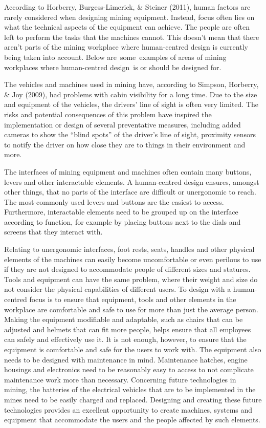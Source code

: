 \documentclass[
  12pt,
]{scrbook}
\begin{document}
According to Horberry, Burgess-Limerick, \& Steiner (2011), human factors are rarely considered when designing mining equipment. Instead, focus often lies on what the technical aspects of the equipment can achieve. The people are often left to perform the tasks that the machines cannot. This doesn't mean that there aren't parts of the mining workplace where human-centred design is currently being taken into account. Below are~some~examples of areas of mining workplaces where human-centred design~is or should be designed for.

The vehicles and machines used in mining have, according to Simpson, Horberry, \& Joy (2009), had problems with cabin visibility for a long time. Due to the size and equipment of the vehicles, the drivers' line of sight is often very limited. The risks and potential consequences of this problem have inspired the implementation or design of several preventative measures, including added cameras to show the ``blind spots'' of the driver's line of sight, proximity sensors to notify the driver on how close they are to things in their environment and more.

The interfaces of mining equipment and machines often contain many buttons, levers and other interactable elements. A human-centred design ensures, amongst other things, that no parts of the interface are difficult or unergonomic to reach. The most-commonly used levers and buttons are the easiest to access. Furthermore, interactable elements need to be grouped up on the interface according to function, for example by placing buttons next to the dials and screens that they interact with.

Relating to unergonomic interfaces, foot rests, seats, handles and other physical elements of the machines can easily become uncomfortable or even perilous to use if they are not designed to accommodate people of different sizes and statures. Tools and equipment can have the same problem, where their weight and size do not consider the physical capabilities of different users. To design with a human-centred focus is to ensure that equipment, tools and other elements in the workplace are comfortable and safe to use for more than just the average person. Making the equipment modifiable and adaptable, such as chairs that can be adjusted and helmets that can fit more people, helps ensure that all employees can safely and effectively use it. It is not enough, however, to ensure that the equipment is comfortable and safe for the users to work with. The equipment also needs to be designed with maintenance in mind. Maintenance hatches, engine housings and electronics need to be reasonably easy to access to not complicate maintenance work more than necessary. Concerning future technologies in mining, the batteries of the electrical vehicles that are to be implemented in the mines need to be easily charged and replaced. Designing and creating these future technologies provides an excellent opportunity to create machines, systems and equipment that accommodate the users and the people affected by such elements.
\end{document}
